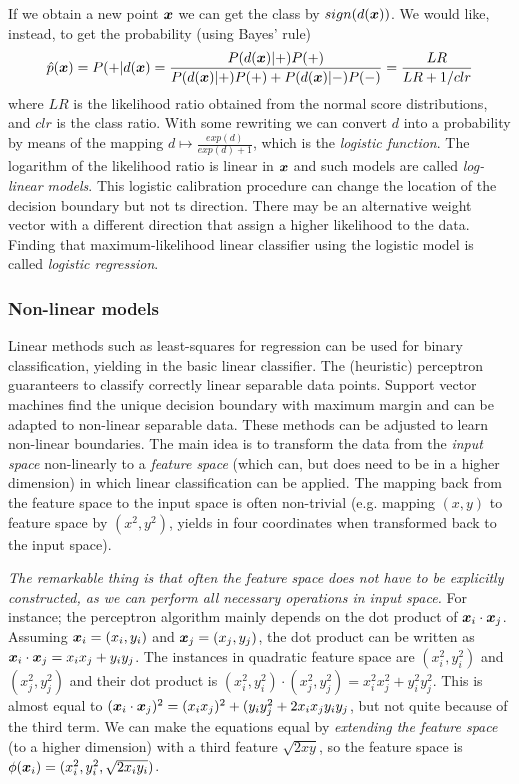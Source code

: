 If we obtain a new point $\vectorsym{x}$ we can get the class by $sign(d(\vectorsym{x}))$.
We would like, instead, to get the probability (using Bayes' rule)
\begin{equation}
  \hat{p}(\vectorsym{x}) = P(+|d(\vectorsym{x}) = \frac{P(d(\vectorsym{x})|+)P(+)}{P(d(\vectorsym{x})|+)P(+) + P(d(\vectorsym{x})|-)P(-)} = \frac{LR}{LR + 1/clr}
\end{equation}
where $LR$ is the likelihood ratio obtained from the normal score distributions, and $clr$ is the class ratio.
With some rewriting we can convert $d$ into a probability by means of the mapping $d \mapsto \frac{exp(d)}{exp(d) + 1}$, which is the \emph{logistic function}.
The logarithm of the likelihood ratio is linear in $\vectorsym{x}$ and such models are called \emph{log-linear models}.
This logistic calibration procedure can change the location of the decision boundary but not ts direction.
There may be an alternative weight vector with a different direction that assign a higher likelihood to the data.
Finding that maximum-likelihood linear classifier using the logistic model is called \emph{logistic regression}.

\subsubsection{Non-linear models}\label{non-linear}
Linear methods such as least-squares for regression can be used for binary classification, yielding in the basic linear classifier.
The (heuristic) perceptron guaranteers to classify correctly linear separable data points.
Support vector machines find the unique decision boundary with maximum margin and can be adapted to non-linear separable data.
These methods can be adjusted to learn non-linear boundaries.
The main idea is to transform the data from the \emph{input space} non-linearly to a \emph{feature space} (which can, but does need to be in a higher dimension) in which linear classification can be applied.
The mapping back from the feature space to the input space is often non-trivial (e.g. mapping $(x,y)$ to feature space by $(x^2, y^2)$, yields in four coordinates when transformed back to the input space).

\emph{The remarkable thing is that often the feature space does not have to be explicitly constructed, as we can perform all necessary operations in input space.}
For instance; the perceptron algorithm mainly depends on the dot product of $\vectorsym{x}_i \cdot \vectorsym{x}_j$.
Assuming $\vectorsym{x}_i = (x_i, y_i)$ and $\vectorsym{x}_j = (x_j, y_j)$, the dot product can be written as $\vectorsym{x}_i \cdot \vectorsym{x}_j = x_i x_j + y_i y_j$.
The instances in quadratic feature space are $(x_i^2, y_i^2)$ and $(x_j^2, y_j^2)$ and their dot product is $(x_i^2, y_i^2) \cdot (x_j^2, y_j^2) = x_i^2 x_j^2 + y_i^2 y_j^2$.
This is almost equal to $(\vectorsym{x}_i \cdot \vectorsym{x}_j)^2 = (x_i x_j)^2 + (y_i y_j^2 + 2 x_i x_j y_i y_j$, but not quite because of the third term.
We can make the equations equal by \emph{extending the feature space} (to a higher dimension) with a third feature $\sqrt{2xy}$, so the feature space is $\phi(\vectorsym{x}_i) = (x_i^2, y_i^2, \sqrt{2x_i y_i})$.

